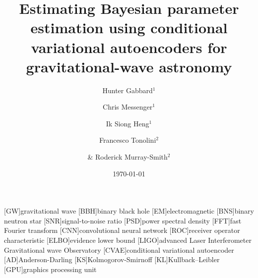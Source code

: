 \documentclass[%
showpacs,
 amsmath,amssymb,
 aps,
 twocolumn,
 prl,
 reprint,
floatfix,
]{revtex4-1}
\begin{document}

\title{Estimating Bayesian parameter estimation using conditional variational
autoencoders for gravitational-wave astronomy}

\author{Hunter Gabbard$^1$}
\author{Chris Messenger$^1$}
\author{Ik Siong Heng$^1$}
\author{Francesco Tonolini$^2$}
\author{\& Roderick Murray-Smith$^2$}


\date{\today}

\maketitle

[GW]{gravitational wave}
[BBH]{binary black hole}
[EM]{electromagnetic}
[BNS]{binary neutron star}
[SNR]{signal-to-noise ratio}
[PSD]{power spectral density}
[FFT]{fast Fourier transform}
[CNN]{convolutional neural network}
[ROC]{receiver operator characteristic}
[ELBO]{evidence lower bound}
[LIGO]{advanced Laser Interferometer Gravitational wave Observatory}
[CVAE]{conditional variational autoencoder}
[AD]{Anderson-Darling}
[KS]{Kolmogorov-Smirnoff}
[KL]{Kullback–Leibler}
[GPU]{graphics processing unit}
\end{document}
